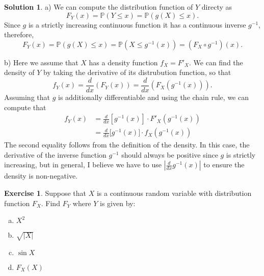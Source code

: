 \documentclass[12pt]{article}
\newcommand{\Prob}{\mathbb{P}}
\newcommand{\abs}[1]{ \left| #1 \right| }
\newcommand{\diff}[2]{\frac{d #1}{d #2}}
\theoremstyle{definition}
\newtheorem{exer}{Exercise}
\newtheorem{sol}{Solution}
\theoremstyle{remark}
\begin{document}
\begin{sol}\leavevmode
    
    a) We can compute the distribution function of $Y$ directy as
    \begin{equation}
        F_Y(x) = \Prob(Y\leq x) = \Prob(g(X)\leq x).
    \end{equation}
    Since $g$ is a strictly increasing continuous function it has a continuous inverse $g^{-1}$, therefore,
    \begin{equation}
        F_Y(x) = \Prob(g(X)\leq x) = \Prob(X \leq g^{-1}(x)) = (F_X\circ g^{-1})(x).
    \end{equation}
    
    b) Here we assume that $X$ has a density function $f_X = F'_X$. We can find the density of $Y$ by taking the derivative of its distrubution function, so that
    \begin{equation}
        f_Y(x) = \diff{}{x}(F_Y(x)) = \diff{}{x}(F_X(g^{-1}(x))).
    \end{equation}
    Assuming that $g$ is additionally differentiable and using the chain rule, we can compute that
    \begin{align}
        f_Y(x) &= \diff{}{x} \left[g^{-1}(x)\right] \cdot F'_X(g^{-1}(x))\\
               &= \diff{}{x} \big[ g^{-1}(x) \big]\cdot f_X(g^{-1}(x))
    \end{align}
    The second equality follows from the definition of the density. In this case, the derivative of the inverse function $g^{-1}$ should always be positive since $g$ is strictly increasing, but in general, I believe we have to use $\abs{\diff{}{x}g^{-1}(x)}$ to ensure the density is non-negative.
\end{sol}

\newpage
\begin{exer}
Suppose that $X$ is a continuous random variable with distribution function $F_X$. Find $F_Y$ where $Y$ is given by:
\begin{enumerate}[a)]
    \item $X^2$
    \item $\sqrt{\abs{X}}$
    \item $\sin X$
    \item $F_X(X)$
\end{enumerate}
\end{exer}
\end{document}
